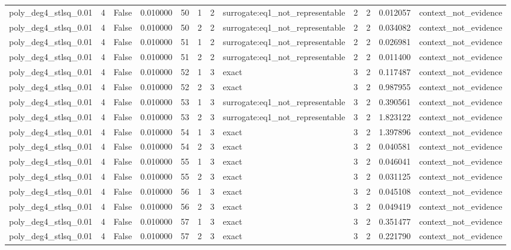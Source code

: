 \begin{tabular}{lrrrrrrlrrrl}
poly\_deg4\_stlsq\_0.01 & 4 & False & 0.010000 & 50 & 1 & 2 & surrogate:eq1\_not\_representable & 2 & 2 & 0.012057 & context\_not\_evidence \\
poly\_deg4\_stlsq\_0.01 & 4 & False & 0.010000 & 50 & 2 & 2 & surrogate:eq1\_not\_representable & 2 & 2 & 0.034082 & context\_not\_evidence \\
poly\_deg4\_stlsq\_0.01 & 4 & False & 0.010000 & 51 & 1 & 2 & surrogate:eq1\_not\_representable & 2 & 2 & 0.026981 & context\_not\_evidence \\
poly\_deg4\_stlsq\_0.01 & 4 & False & 0.010000 & 51 & 2 & 2 & surrogate:eq1\_not\_representable & 2 & 2 & 0.011400 & context\_not\_evidence \\
poly\_deg4\_stlsq\_0.01 & 4 & False & 0.010000 & 52 & 1 & 3 & exact & 3 & 2 & 0.117487 & context\_not\_evidence \\
poly\_deg4\_stlsq\_0.01 & 4 & False & 0.010000 & 52 & 2 & 3 & exact & 3 & 2 & 0.987955 & context\_not\_evidence \\
poly\_deg4\_stlsq\_0.01 & 4 & False & 0.010000 & 53 & 1 & 3 & surrogate:eq1\_not\_representable & 3 & 2 & 0.390561 & context\_not\_evidence \\
poly\_deg4\_stlsq\_0.01 & 4 & False & 0.010000 & 53 & 2 & 3 & surrogate:eq1\_not\_representable & 3 & 2 & 1.823122 & context\_not\_evidence \\
poly\_deg4\_stlsq\_0.01 & 4 & False & 0.010000 & 54 & 1 & 3 & exact & 3 & 2 & 1.397896 & context\_not\_evidence \\
poly\_deg4\_stlsq\_0.01 & 4 & False & 0.010000 & 54 & 2 & 3 & exact & 3 & 2 & 0.040581 & context\_not\_evidence \\
poly\_deg4\_stlsq\_0.01 & 4 & False & 0.010000 & 55 & 1 & 3 & exact & 3 & 2 & 0.046041 & context\_not\_evidence \\
poly\_deg4\_stlsq\_0.01 & 4 & False & 0.010000 & 55 & 2 & 3 & exact & 3 & 2 & 0.031125 & context\_not\_evidence \\
poly\_deg4\_stlsq\_0.01 & 4 & False & 0.010000 & 56 & 1 & 3 & exact & 3 & 2 & 0.045108 & context\_not\_evidence \\
poly\_deg4\_stlsq\_0.01 & 4 & False & 0.010000 & 56 & 2 & 3 & exact & 3 & 2 & 0.049419 & context\_not\_evidence \\
poly\_deg4\_stlsq\_0.01 & 4 & False & 0.010000 & 57 & 1 & 3 & exact & 3 & 2 & 0.351477 & context\_not\_evidence \\
poly\_deg4\_stlsq\_0.01 & 4 & False & 0.010000 & 57 & 2 & 3 & exact & 3 & 2 & 0.221790 & context\_not\_evidence \\

\end{tabular}
